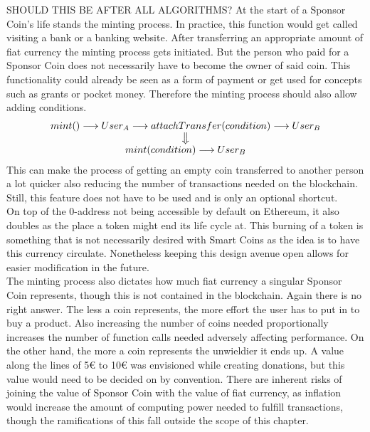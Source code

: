 SHOULD THIS BE AFTER ALL ALGORITHMS? 
At the start of a Sponsor Coin's life stands the minting process. In practice, this function would get called visiting a bank or a banking website. After transferring an appropriate amount of fiat currency the minting process gets initiated. But the person who paid for a Sponsor Coin does not necessarily have to become the owner of said coin. This functionality could already be seen as a form of payment or get used for concepts such as grants or pocket money. Therefore the minting process should also allow adding conditions.\\
\begin{equation*}
\begin{array}{c}
    mint() \longrightarrow \emph{$User_A$} \longrightarrow attachTransfer(condition) \longrightarrow \emph{$User_B$} \\
    \big\Downarrow \\
    mint(condition) \longrightarrow \emph{$User_B$}
\end{array}
\end{equation*}
This can make the process of getting an empty coin transferred to another person a lot quicker also reducing the number of transactions needed on the blockchain. Still, this feature does not have to be used and is only an optional shortcut.\\
On top of the 0-address not being accessible by default on Ethereum, it also doubles as the place a token might end its life cycle at. This burning of a token is something that is not necessarily desired with Smart Coins as the idea is to have this currency circulate. Nonetheless keeping this design avenue open allows for easier modification in the future.\\
The minting process also dictates how much fiat currency a singular Sponsor Coin represents, though this is not contained in the blockchain. Again there is no right answer. The less a coin represents, the more effort the user has to put in to buy a product. Also increasing the number of coins needed proportionally increases the number of function calls needed adversely affecting performance. On the other hand, the more a coin represents the unwieldier it ends up. A value along the lines of 5€ to 10€ was envisioned while creating donations, but this value would need to be decided on by convention. There are inherent risks of joining the value of Sponsor Coin with the value of fiat currency, as inflation would increase the amount of computing power needed to fulfill transactions, though the ramifications of this fall outside the scope of this chapter.